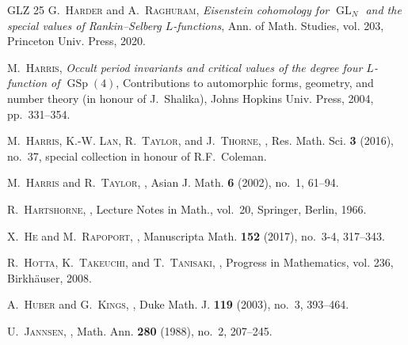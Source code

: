 \documentclass[cjm]{ipart}
\theoremstyle{plain}
\theoremstyle{remark}
\numberwithin{equation}{subsection}
\begin{document}
\begin{thebibliography}{GLZ 25}
\textsc{G.~Harder} and \textsc{A.~Raghuram}, \emph{Eisenstein cohomology for
  {$\operatorname{GL}_N$} and the special values of {R}ankin--{S}elberg
  {$L$}-functions}, Ann. of Math. Studies, vol. 203, Princeton Univ. Press,
  2020. 

\textsc{M.~Harris}, \emph{Occult period invariants and critical values of the
  degree four {$L$}-function of {$\operatorname{GSp}(4)$}}, Contributions to
  automorphic forms, geometry, and number theory (in honour of {J}.~{S}halika),
  Johns Hopkins Univ. Press, 2004, pp.~331--354. 

\textsc{M.~Harris, K.-W. Lan, R.~Taylor,} and \textsc{J.~Thorne},
  , Res. Math. Sci. \textbf{3}
  (2016), no.~37, special collection in honour of R.F.~Coleman. 

\textsc{M.~Harris} and \textsc{R.~Taylor},
  , Asian J. Math. \textbf{6} (2002), no.~1,
  61--94. 

\textsc{R.~Hartshorne},
  ,
  Lecture Notes in Math., vol.~20, Springer, Berlin, 1966. 

\textsc{X.~He} and \textsc{M.~Rapoport},
  , Manuscripta Math. \textbf{152}
  (2017), no.~3-4, 317--343. 

\textsc{R.~Hotta, K.~Takeuchi,} and \textsc{T.~Tanisaki},
  , Progress in Mathematics, vol.
  236, Birkh\"auser, 2008. 

\textsc{A.~Huber} and \textsc{G.~Kings},
  , Duke Math. J. \textbf{119} (2003), no.~3, 393--464.

\textsc{U.~Jannsen},
  , Math. Ann. \textbf{280} (1988), no.~2, 207--245. 


\end{thebibliography}
\end{document}
